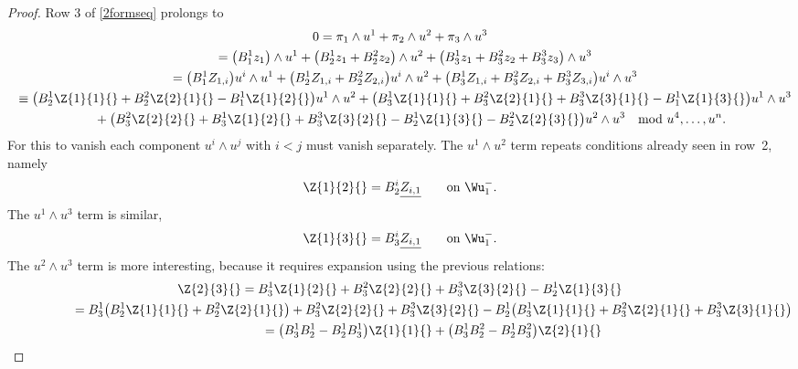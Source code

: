 \begin{proof}
Row 3 of \eqref{2formseq} prolongs to
\begin{gather*}
0 =
\pi_1 \wedge u^1 + \pi_2 \wedge u^2 + \pi_3 \wedge u^3\\
\hphantom{0}{} =
    \big( B^{1}_{1} z_1 \big)\wedge u^1
   +\big( B^{1}_{2} z_1
         + B^{2}_{2} z_2 \big)\wedge u^2
   +\big( B^{1}_{3} z_1
         + B^{2}_{3} z_2
         + B^{3}_{3} z_3 \big)\wedge u^3\\
\hphantom{0}{}
=
    \big( B^{1}_{1} Z_{1,i} \big)u^i \wedge u^1
   +\big( B^{1}_{2} Z_{1,i}
         + B^{2}_{2} Z_{2,i} \big)u^i \wedge u^2
   +\big( B^{1}_{3} Z_{1,i}
         + B^{2}_{3} Z_{2,i}
         + B^{3}_{3} Z_{3,i}\big)u^i \wedge u^3\\
\hphantom{0}{}
\equiv
\big(
     B^{1}_{2} \Z{1}{1}{}
   + B^{2}_{2} \Z{2}{1}{}
   - B^{1}_{1} \Z{1}{2}{}\big)u^1\wedge u^2
+ \big(
     B^{1}_{3} \Z{1}{1}{}
   + B^{2}_{3} \Z{2}{1}{}
   + B^{3}_{3} \Z{3}{1}{}
   - B^{1}_{1} \Z{1}{3}{}
   \big)u^1 \wedge u^3\\
\hphantom{0=}{}
+\big(
     B^{2}_{3} \Z{2}{2}{}
   + B^{1}_{3} \Z{1}{2}{}
   + B^{3}_{3} \Z{3}{2}{}
   - B^{1}_{2} \Z{1}{3}{}
   - B^{2}_{2} \Z{2}{3}{}  \big)u^2\wedge u^3  \
    \mod u^4,\ldots,u^n.
\end{gather*}
For this to vanish each component $u^i \wedge u^j$ with $i < j$ must vanish separately.
The $u^1\wedge u^2$ term repeats conditions already seen in row~2, namely
\begin{gather*}
\Z{1}{2}{}  =  B^{i}_{2}\underline{Z_{i,1}} \qquad \text{on $\Wu^-_1$}.
\end{gather*}
The $u^1 \wedge u^3$ term is similar,
\begin{gather*}
\Z{1}{3}{}  =  B^{i}_{3}\underline{Z_{i,1}} \qquad \text{on $\Wu^-_1$}.
\end{gather*}
The $u^2\wedge u^3$ term is more interesting, because it requires expansion
using the previous relations:
\begin{gather}
\Z{2}{3}{}
=
 B^{1}_{3}\Z{1}{2}{} + B^{2}_{3}\Z{2}{2}{} +
 B^{3}_{3}\Z{3}{2}{} - B^{1}_{2}\Z{1}{3}{}\nonumber\\
\hphantom{\Z{2}{3}{}}{}
=
 B^{1}_{3}\big( B^{1}_{2}\Z{1}{1}{} +
 B^{2}_{2}\Z{2}{1}{}\big) + B^{2}_{3}\Z{2}{2}{} +
 B^{3}_{3}\Z{3}{2}{}
 - B^{1}_{2}\big( B^{1}_{3}\Z{1}{1}{}
 + B^{2}_{3}\Z{2}{1}{} + B^{3}_{3}\Z{3}{1}{}\big)\nonumber\\
\hphantom{\Z{2}{3}{}}{}
=
 \big(B^{1}_{3}B^{1}_{2} - B^{1}_{2}B^{1}_{3}\big)\Z{1}{1}{}
+\big(B^{1}_{3}B^{2}_{2} - B^{1}_{2}B^{2}_{3}\big)\Z{2}{1}{}\nonumber\\

\end{gather}
\end{proof}
